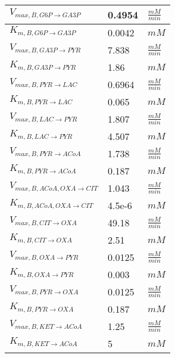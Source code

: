 \begin{supertabular}{lll}
$V_{max, B,G6P \xrightarrow[]{} GA3P}$ & 0.4954 & $\frac{mM}{min}$       \\ \hline
$K_{m, B,G6P \xrightarrow[]{} GA3P}$ & 0.0042 & $mM$   \\ \hline

$V_{max, B,GA3P \xrightarrow[]{} PYR}$ & 7.838 & $\frac{mM}{min}$       \\ \hline
$K_{m, B,GA3P \xrightarrow[]{} PYR}$ & 1.86 & $mM$   \\ \hline

$V_{max, B,PYR \xrightarrow[]{} LAC}$ & 0.6964 & $\frac{mM}{min}$       \\ \hline
$K_{m, B,PYR \xrightarrow[]{} LAC}$ & 0.065 & $mM$   \\ \hline

$V_{max, B,LAC \xrightarrow[]{} PYR}$ & 1.807 & $\frac{mM}{min}$       \\ \hline
$K_{m, B,LAC \xrightarrow[]{} PYR}$ & 4.507 & $mM$   \\ \hline

$V_{max, B,PYR \xrightarrow[]{} ACoA}$ & 1.738 & $\frac{mM}{min}$       \\ \hline
$K_{m, B,PYR \xrightarrow[]{} ACoA}$ & 0.187 & $mM$   \\ \hline

$V_{max, B,ACoA,OXA \xrightarrow[]{} CIT}$ & 1.043 & $\frac{mM}{min}$       \\ \hline
$K_{m, B,ACoA,OXA \xrightarrow[]{} CIT}$ & 4.5e-6  & $mM$   \\ \hline

$V_{max, B,CIT \xrightarrow[]{} OXA}$ & 49.18 & $\frac{mM}{min}$       \\ \hline
$K_{m, B,CIT \xrightarrow[]{} OXA}$ & 2.51 & $mM$   \\ \hline

$V_{max, B,OXA \xrightarrow[]{} PYR}$ & 0.0125 & $\frac{mM}{min}$       \\ \hline
$K_{m, B,OXA \xrightarrow[]{} PYR}$ & 0.003 & $mM$   \\ \hline

$V_{max, B,PYR \xrightarrow[]{} OXA}$ & 0.0125 & $\frac{mM}{min}$       \\ \hline
$K_{m, B,PYR \xrightarrow[]{} OXA}$ & 0.187 & $mM$   \\ \hline

$V_{max, B,KET \xrightarrow[]{} ACoA}$ & 1.25 & $\frac{mM}{min}$       \\ \hline
$K_{m, B,KET \xrightarrow[]{} ACoA}$ & 5 & $mM$   \\ \hline


\end{supertabular}
